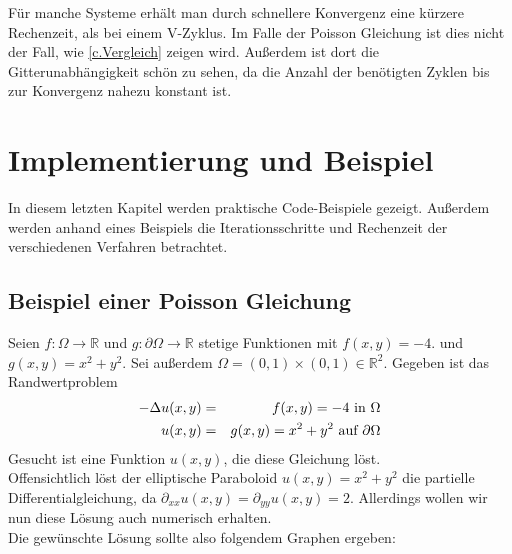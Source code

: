  \label{W-Cycle}

Für manche Systeme erhält man durch schnellere Konvergenz eine kürzere Rechenzeit, als bei einem V-Zyklus. Im Falle der Poisson Gleichung ist dies nicht der Fall, wie \autoref{c.Vergleich} zeigen wird. Außerdem ist dort die Gitterunabhängigkeit schön zu sehen, da die Anzahl der benötigten Zyklen bis zur Konvergenz nahezu konstant ist.

\chapter{Implementierung und Beispiel}\label{c.Vergleich}

In diesem letzten Kapitel werden praktische Code-Beispiele gezeigt. Außerdem werden anhand eines Beispiels die Iterationsschritte und Rechenzeit der verschiedenen Verfahren betrachtet.

\section{Beispiel einer Poisson Gleichung}\label{s.Beispiel einer Poisson Gleichung}

Seien $f: \Omega \rightarrow \mathbb{R}$ und $g: \partial\Omega \rightarrow \mathbb{R}$ stetige Funktionen mit $f(x,y) = -4.$ und $g(x,y) = x^{2} + y^{2}$. Sei außerdem $\Omega = (0,1)\times(0,1) \in \mathbb{R}^{2}$. Gegeben ist das Randwertproblem
\begin{eqnarray}
        -\Delta u(x,y) &=& f(x,y) = -4 \textnormal{ in } \Omega \\
    u(x,y) &=& g(x,y) = x^{2} + y^{2} \textnormal{ auf } \partial \Omega
\end{eqnarray}
Gesucht ist eine Funktion $u(x,y)$, die diese Gleichung löst. \\
Offensichtlich löst der elliptische Paraboloid $u(x,y) = x^{2} + y^{2}$ die partielle Differentialgleichung, da $\partial_{xx}u(x,y) = \partial_{yy}u(x,y) = 2$. Allerdings wollen wir nun diese Lösung auch numerisch erhalten.\\
Die gewünschte Lösung sollte also folgendem Graphen ergeben:


